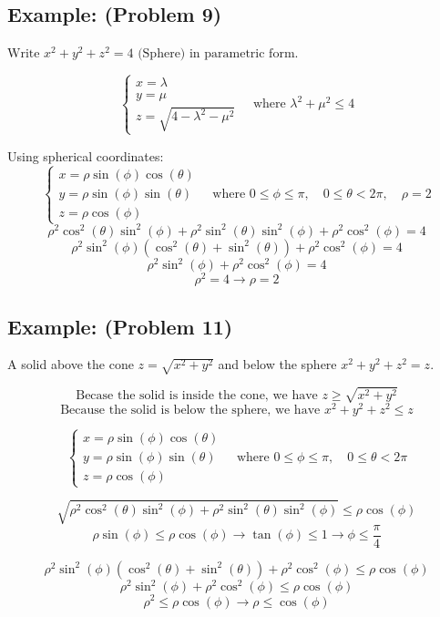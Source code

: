 \documentclass[11pt]{article}
\begin{document}
\subsection*{Example: (Problem 9)}
$\text{Write } x^2 + y^2 + z^2 = 4 \text{ (Sphere)} \text{ in parametric form}$.

\[
\begin{cases}
    x = \lambda \\
    y = \mu \\
    z = \sqrt{4 - \lambda^2 - \mu^2}
\end{cases}
\quad \text{where } \lambda^2 + \mu^2 \leq 4
\]

Using spherical coordinates:
\[
\begin{cases}
    x = \rho \sin(\phi) \cos(\theta) \\
    y = \rho \sin(\phi) \sin(\theta) \\
    z = \rho \cos(\phi)
\end{cases}
\quad \text{where } 0 \leq \phi \leq \pi, \quad 0 \leq \theta < 2\pi, \quad \rho = 2
\]
\[
\rho^2\cos^2(\theta)\sin^2(\phi) + \rho^2\sin^2(\theta)\sin^2(\phi) + \rho^2\cos^2(\phi) = 4
\]
\[
\rho^2\sin^2(\phi)(\cos^2(\theta) + \sin^2(\theta)) + \rho^2\cos^2(\phi) = 4
\]
\[
\rho^2\sin^2(\phi) + \rho^2\cos^2(\phi) = 4
\]
\[
\rho^2 = 4 \rightarrow \rho = 2
\]

\subsection*{Example: (Problem 11)}
A solid above the cone $z = \sqrt{x^2 + y^2}$ and below the sphere $x^2 + y^2 + z^2 = z$.

\[
\text{Becase the solid is inside the cone, we have } z \geq \sqrt{x^2 + y^2}
\]
\[
\text{Because the solid is below the sphere, we have } x^2 + y^2 + z^2 \leq z
\]

\[
\begin{cases}
    x = \rho \sin(\phi) \cos(\theta) \\
    y = \rho \sin(\phi) \sin(\theta) \\
    z = \rho \cos(\phi)
\end{cases}
\quad \text{where } 0 \leq \phi \leq \pi, \quad 0 \leq \theta < 2\pi
\]

\[
\sqrt{\rho^2\cos^2(\theta)\sin^2(\phi) + \rho^2\sin^2(\theta)\sin^2(\phi)} \leq \rho\cos(\phi)
\]
\[
\rho\sin(\phi) \leq \rho\cos(\phi) \rightarrow \tan(\phi) \leq 1 \rightarrow \phi \leq \frac{\pi}{4}
\]

\[
\rho^2\sin^2(\phi)(\cos^2(\theta) + \sin^2(\theta)) + \rho^2\cos^2(\phi) \leq \rho\cos(\phi)
\]
\[
\rho^2\sin^2(\phi) + \rho^2\cos^2(\phi) \leq \rho\cos(\phi)
\]
\[  
\rho^2 \leq \rho\cos(\phi) \rightarrow \rho \leq \cos(\phi)
\]
\end{document}

